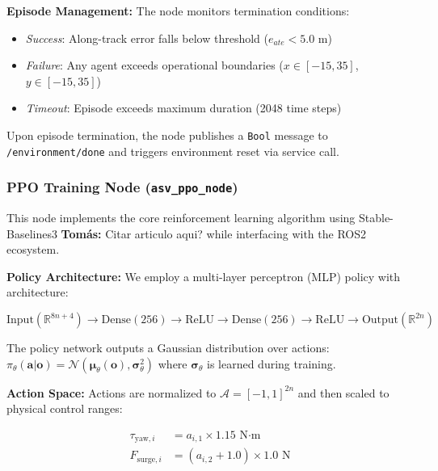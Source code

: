 \documentclass[preprint,3p]{elsarticle}
\newcommand{\tcom}[1]{{ \color{blue}\textbf{Tomás:} #1}}
\begin{document}
\textbf{Episode Management:} The node monitors termination conditions:
\begin{itemize}
    \item \textit{Success}: Along-track error falls below threshold ($e_{ate} < 5.0$ m)
    \item \textit{Failure}: Any agent exceeds operational boundaries ($x \in [-15, 35]$, $y \in [-15, 35]$)
    \item \textit{Timeout}: Episode exceeds maximum duration (2048 time steps)
\end{itemize}

Upon episode termination, the node publishes a \texttt{Bool} message to \texttt{/environment/done} and triggers environment reset via service call.

\subsubsection{PPO Training Node (\texttt{asv\_ppo\_node})}

This node implements the core reinforcement learning algorithm using Stable-Baselines3 \tcom{Citar articulo aqui?} \cite{stable-baselines3} while interfacing with the ROS2 ecosystem.

\vspace{1em}

\textbf{Policy Architecture:} We employ a multi-layer perceptron (MLP) policy with architecture:

\begin{equation}
    \text{Input}(\mathbb{R}^{8n+4}) \rightarrow \text{Dense}(256) \rightarrow \text{ReLU} \rightarrow \text{Dense}(256) \rightarrow \text{ReLU} \rightarrow \text{Output}(\mathbb{R}^{2n})
\end{equation}

The policy network outputs a Gaussian distribution over actions: $\pi_\theta(\mathbf{a}|\mathbf{o}) = \mathcal{N}(\boldsymbol{\mu}_\theta(\mathbf{o}), \boldsymbol{\sigma}_\theta^2)$ where $\boldsymbol{\sigma}_\theta$ is learned during training.

\vspace{1em}

\textbf{Action Space:} Actions are normalized to $\mathcal{A} = [-1, 1]^{2n}$ and then scaled to physical control ranges:

\begin{align}
    \tau_{\text{yaw},i} &= a_{i,1} \times 1.15 \text{ N·m} \\
    F_{\text{surge},i} &= (a_{i,2} + 1.0) \times 1.0 \text{ N}
\end{align}
\end{document}
